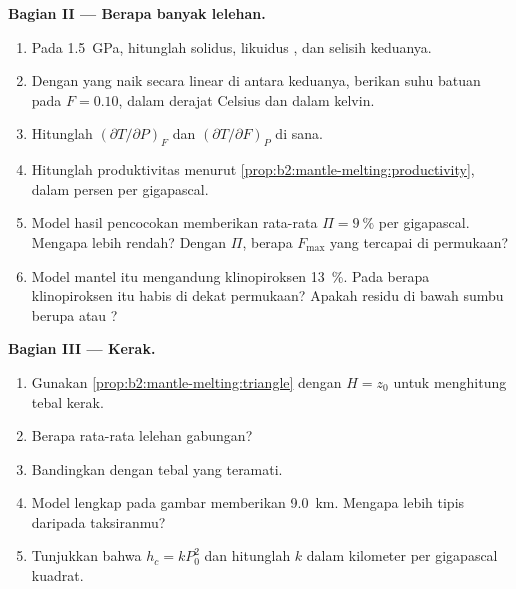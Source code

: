 \begin{problem}
\noindent\textbf{Bagian II --- Berapa banyak lelehan.}
\begin{enumerate}[resume]
\item Pada \qty{1.5}{GPa}, hitunglah solidus, likuidus , dan
selisih keduanya.
\item Dengan  yang naik secara linear di antara keduanya, berikan suhu
batuan pada $F = 0.10$, dalam derajat Celsius dan dalam kelvin.
\item Hitunglah $(\partial T/\partial P)_F$ dan $(\partial T/\partial F)_P$ di sana.
\item Hitunglah produktivitas menurut \cref{prop:b2:mantle-melting:productivity}, dalam
persen per gigapascal.
\item Model hasil pencocokan memberikan rata-rata $\Pi = \qty{9}{\percent}$ per gigapascal.
Mengapa lebih rendah? Dengan $\Pi$, berapa  $F_{\max}$ yang tercapai di
permukaan?
\item Model mantel itu mengandung klinopiroksen \qty{13}{\percent}. Pada 
berapa klinopiroksen itu habis di dekat permukaan? Apakah residu di bawah sumbu berupa
 atau ?
\end{enumerate}

\noindent\textbf{Bagian III --- Kerak.}
\begin{enumerate}[resume]
\item Gunakan \cref{prop:b2:mantle-melting:triangle} dengan $H = z_0$ untuk menghitung
tebal kerak.
\item Berapa  rata-rata lelehan gabungan?
\item Bandingkan dengan tebal yang teramati.
\item Model lengkap pada gambar memberikan \qty{9.0}{km}. Mengapa lebih tipis daripada
taksiranmu?
\item Tunjukkan bahwa $h_c = k P_0^2$ dan hitunglah $k$ dalam kilometer per
gigapascal kuadrat.
\end{enumerate}


\end{problem}
